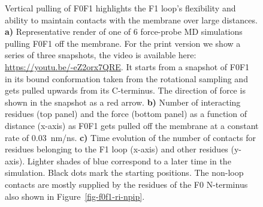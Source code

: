 \documentclass[
  twocolumn]{biophys-new-mod}
\begin{document}
\begin{figure}
\begin{minipage}[t]{\linewidth}
{{}

}

\subcaption{\label{fig-f0f1-vert-pull-force}~}
\end{minipage}%
\newline
\begin{minipage}[t]{\linewidth}

{\centering 


}

\subcaption{\label{fig-f0f1-vert-pull-contacts}~}
\end{minipage}%

\caption{\label{fig-f0f1-vert-pull}Vertical pulling of F0F1 highlights
the F1 loop's flexibility and ability to maintain contacts with the
membrane over large distances. \textbf{a)} Representative render of one
of 6 force-probe MD simulations pulling F0F1 off the membrane. For the
print version we show a series of three snapshots, the video is
available here: \url{https://youtu.be/-eZ2orx7QRE}. It starts from a
snapshot of F0F1 in its bound conformation taken from the rotational
sampling and gets pulled upwards from its C-terminus. The direction of
force is shown in the snapshot as a red arrow. \textbf{b)} Number of
interacting residues (top panel) and the force (bottom panel) as a
function of distance (x-axis) as F0F1 gets pulled off the membrane at a
constant rate of 0.03~nm/ns. \textbf{c)} Time evolution of the number of
contacts for residues belonging to the F1 loop (x-axis) and other
residues (y-axis). Lighter shades of blue correspond to a later time in
the simulation. Black dots mark the starting positions. The non-loop
contacts are mostly supplied by the residues of the F0 N-terminus also
shown in Figure~\ref{fig-f0f1-ri-npip}.}

\end{figure}
\end{document}
